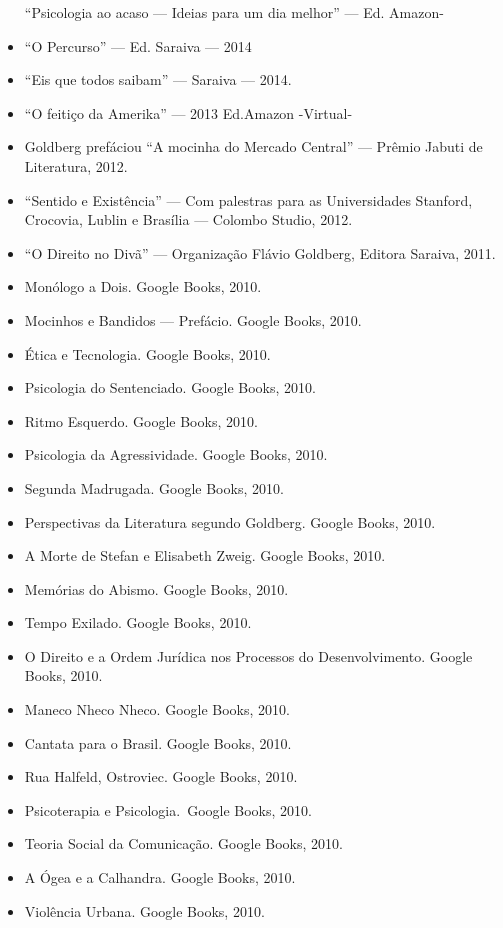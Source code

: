 \begin{itemize}
  ``Psicologia ao acaso --- Ideias para um dia melhor'' --- Ed. Amazon-
\item
  ``O Percurso'' --- Ed. Saraiva --- 2014
\item
  ``Eis que todos saibam'' ---  Saraiva --- 2014.
\item
  ``O feitiço da Amerika'' --- 2013 Ed.Amazon -Virtual-
\item
  Goldberg prefáciou ``A mocinha do Mercado Central'' --- Prêmio Jabuti
  de Literatura, 2012.
\item
  ``Sentido e Existência'' --- Com palestras para as Universidades
  Stanford, Crocovia, Lublin e Brasília --- Colombo Studio, 2012.
\item
  ``O Direito no Divã'' --- Organização Flávio Goldberg, Editora
  Saraiva, 2011.
\item
  Monólogo a Dois. Google Books, 2010.
\item
  Mocinhos e Bandidos --- Prefácio. Google Books, 2010.
\item
  Ética e Tecnologia. Google Books, 2010.
\item
  Psicologia do Sentenciado. Google Books, 2010.
\item
  Ritmo Esquerdo. Google Books, 2010.
\item
  Psicologia da Agressividade. Google Books, 2010.
\item
  Segunda Madrugada. Google Books, 2010.
\item
  Perspectivas da Literatura segundo Goldberg. Google Books, 2010.
\item
  A Morte de Stefan e Elisabeth Zweig. Google Books, 2010.
\item
  Memórias do Abismo. Google Books, 2010.
\item
  Tempo Exilado. Google Books, 2010.
\item
  O Direito e a Ordem Jurídica nos Processos do Desenvolvimento. Google
  Books, 2010.
\item
  Maneco Nheco Nheco. Google Books, 2010.
\item
  Cantata para o Brasil. Google Books, 2010.
\item
  Rua Halfeld, Ostroviec. Google Books, 2010.
\item
  Psicoterapia e Psicologia.~Google Books, 2010.
\item
  Teoria Social da Comunicação. Google Books, 2010.
\item
  A Ógea e a Calhandra. Google Books, 2010.
\item
  Violência Urbana. Google Books, 2010.

\end{itemize}
